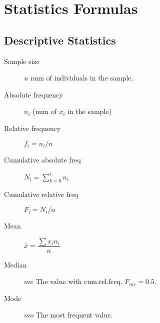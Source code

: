
\sloppy

\section*{Statistics Formulas}

\footnotesize
{}

\begin{multicols*}{2}

\subsection*{Descriptive Statistics}

\begin{tcolorbox}[hbox, title=Frequencies]
\begin{minipage}{0.4\textwidth}
\begin{description}
\item [Sample size] $n$ num of individuals in the sample.
\end{description}
\begin{description}
\item [Absolute frequency] $n_i$ (num of $x_i$ in the sample)
\item [Relative frequency] $f_i=n_i/n$
\item [Cumulative absolute freq] $N_i=\sum_{k=0}^in_i$
\item [Cumulative relative freq] $F_i=N_i/n$
\end{description}
\end{minipage}
\end{tcolorbox}

\begin{tcolorbox}[hbox, title=Central tendency statistics]
\begin{minipage}{0.4\textwidth}
\begin{description}
\item [Mean] $\bar{x}=\dfrac{\sum x_in_i}{n}$
\item [Median] $me$ The value with cum.rel.freq. $F_{me}=0.5$.
\item [Mode] $mo$ The most frequent value.
\end{description}
\end{minipage}
\end{tcolorbox}


\end{multicols*}
